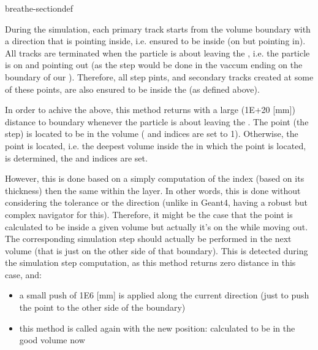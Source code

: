 \documentclass[letterpaper,10pt,english]{sphinxmanual}
\begin{document}
\begin{fulllineitems}
\begin{sphinxuseclass}{breathe-sectiondef}
\begin{fulllineitems}
\sphinxAtStartPar
During the simulation, each primary track starts from the  volume boundary with a direction that is pointing inside, i.e. ensured to be inside (on  but pointing in). All tracks are terminated when the particle is about leaving the , i.e. the particle is on  and pointing out (as the step would be done in the vaccum ending on the boundary of our ). Therefore, all step pints, and secondary tracks created at some of these points, are also ensured to be inside the  (as defined above).

\sphinxAtStartPar
In order to achive the above, this method returns with a large (1E+20 {[}mm{]}) distance to boundary whenever the particle is about leaving the . The point (the step) is located to be in the  volume ( and  indices are set to \sphinxhyphen{}1). Otherwise, the point is located, i.e. the deepest volume inside the  in which the point is located, is determined, the  and  indices are set.

\sphinxAtStartPar
However, this is done based on a simply computation of the  index (based on its thickness) then the same within the layer. In other words, this is done without considering the tolerance or the direction (unlike in Geant4, having a robust but complex navigator for this). Therefore, it might be the case that the point is calculated to be inside a given volume but actually it’s on the  while moving out. The corresponding simulation step should actually be performed in the next volume (that is just on the other side of that boundary). This is detected during the simulation step computation, as this method returns zero distance in this case, and:\begin{itemize}
\item {} 
\sphinxAtStartPar
a small push of 1E\sphinxhyphen{}6 {[}mm{]} is applied along the current direction (just to push the point to the other side of the boundary)

\item {} 
\sphinxAtStartPar
this method is called again with the new position: calculated to be in the good volume now


\end{itemize}
\end{fulllineitems}
\end{sphinxuseclass}
\end{fulllineitems}
\end{document}

